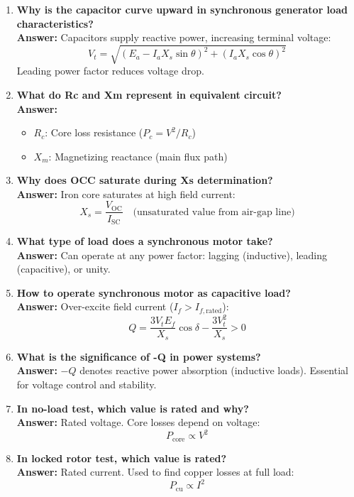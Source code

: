 \documentclass[12pt,a4paper]{article}
\begin{document}
\begin{enumerate}
		\item \textbf{Why is the capacitor curve upward in synchronous generator load characteristics?} \\
		\textbf{Answer:} Capacitors supply reactive power, increasing terminal voltage:
		\[
		V_t = \sqrt{(E_a - I_aX_s\sin\theta)^2 + (I_aX_s\cos\theta)^2}
		\]
		Leading power factor reduces voltage drop.
		
		\item \textbf{What do Rc and Xm represent in equivalent circuit?} \\
		\textbf{Answer:} 
		\begin{itemize}
			\item $R_c$: Core loss resistance ($P_c = V^2/R_c$)
			\item $X_m$: Magnetizing reactance (main flux path)
		\end{itemize}
		
		\item \textbf{Why does OCC saturate during Xs determination?} \\
		\textbf{Answer:} Iron core saturates at high field current:
		\[
		X_s = \frac{V_{\text{OC}}}{I_{\text{SC}}} \quad \text{(unsaturated value from air-gap line)}
		\]
		
		\item \textbf{What type of load does a synchronous motor take?} \\
		\textbf{Answer:} Can operate at any power factor: lagging (inductive), leading (capacitive), or unity.
		
		\item \textbf{How to operate synchronous motor as capacitive load?} \\
		\textbf{Answer:} Over-excite field current ($I_f > I_{f,\text{rated}}$):
		\[
		Q = \frac{3V_tE_f}{X_s}\cos\delta - \frac{3V_t^2}{X_s} > 0
		\]
		
		\item \textbf{What is the significance of -Q in power systems?} \\
		\textbf{Answer:} $-Q$ denotes reactive power absorption (inductive loads). Essential for voltage control and stability.
		
		\item \textbf{In no-load test, which value is rated and why?} \\
		\textbf{Answer:} Rated voltage. Core losses depend on voltage:
		\[
		P_{\text{core}} \propto V^2
		\]
		
		\item \textbf{In locked rotor test, which value is rated?} \\
		\textbf{Answer:} Rated current. Used to find copper losses at full load:
		\[
		P_{\text{cu}} \propto I^2
		\]
		

\end{enumerate}
\end{document}

